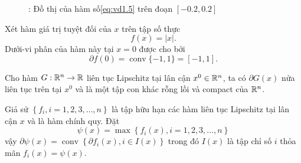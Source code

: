 \begin{figure}
    \centering
    \caption{: Đồ thị của hàm số\eqref{eq:vd1.5} trên đoạn $[-0.2, 0.2]$}
    \label{fig:vd1.5}
\end{figure}

\begin{vd} Xét hàm giá trị tuyệt đối của $x$ trên tập số thực
$$
f(x)=|x| .
$$
Dưới-vi phân của hàm này tại  $x=0$ được cho bởi
$$
\partial f(0)=\operatorname{conv}\{-1,1\}=[-1,1] .
$$
\end{vd}

\begin{md}
    \label{convex_compact}
    Cho hàm $G: \mathbb{R}^n \to \mathbb{R}$ liên tục Lipschitz tại lân cận $x^0 \in \mathbb{R}^n$, ta có $\partial G(x)$ nửa liên tục trên tại $x^0$ và là một tập con khác rỗng lồi và compact của $\mathbb{R}^n$.
\end{md}


\begin{bd}\label{lem:2.7}
 Giả sử $\left\{f_i, i=1,2,3, \ldots, n\right\}$ là tập hữu hạn các hàm liên tục Lipschitz tại lân cận $x$ và là hàm chính quy.
    Đặt
    $$
    \psi(x)=\max \left\{f_i(x), i=1,2,3, \ldots, n\right\}
    $$
    vậy
    $\partial \psi(x)=\operatorname{conv}\left\{\partial f_i(x), i \in I(x)\right\}$
    trong đó $I(x)$ là tập chỉ số $i$ thỏa mãn $f_i(x)=\psi(x)$.
    \end{bd}